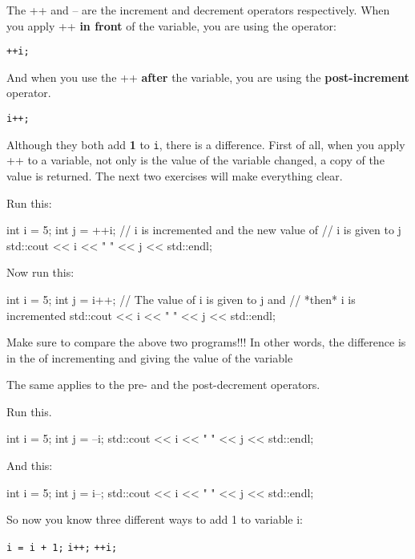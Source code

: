The ++ and -- are the increment and decrement operators respectively. When you apply ++ \textbf{in front} of the variable, you are using the  operator:\\
\begin{center}
  \texttt{++i;}
\end{center}

And when you use the ++ \textbf{after} the variable, you are using the \textbf{post-increment} operator.
\begin{center}
  \texttt{i++;}
\end{center}

Although they both add \textbf{1} to \texttt{i}, there is a difference. First of all, when you apply ++ to a variable, not only is the value of the variable changed, a copy of the value is returned. The next two exercises will make
everything clear.
\begin{ex}
 Run this:
\begin{console}
int i = 5;
int j = ++i; // i is incremented and the new value of 
             // i is given to j
std::cout << i << " " << j << std::endl;
\end{console}
\end{ex}

\begin{ex}
 Now run this:
\begin{console}
int i = 5;
int j = i++; // The value of i is given to j and
             // *then* i is incremented
std::cout << i << " " << j << std::endl;
\end{console}
\end{ex}
Make sure to compare the above two programs!!!
In other words, the difference is in the  of incrementing and giving the value of the variable

The same applies to the pre- and the post-decrement operators.
\begin{ex}
 Run this.
\begin{console}
int i = 5;
int j = --i;
std::cout << i << " " << j << std::endl;
\end{console}
\end{ex}
\begin{ex}
 And this:
\begin{console}
int i = 5;
int j = i--;
std::cout << i << " " << j << std::endl;
\end{console}
\end{ex}

So now you know three different ways to add 1 to variable i:
\begin{center}
 \texttt{i = i + 1;}        \texttt{i++;}        \texttt{++i;}
\end{center}


